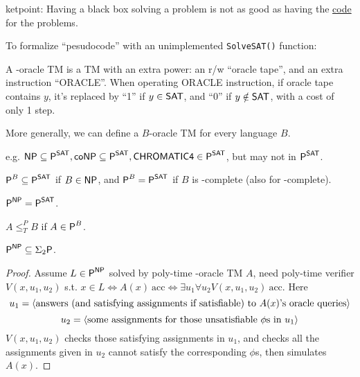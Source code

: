 \documentclass{article}
\begin{document}
ketpoint: Having a black box solving a problem is not as good as having the \ul{code} for the problems.

To formalize ``pesudocode'' with an unimplemented {\tt SolveSAT()} function:

\begin{definition}
  A -oracle TM is a TM with an extra power: an r/w ``oracle tape'', and an extra instruction ``ORACLE''. When operating ORACLE instruction, if oracle tape contains \(y\), it's replaced by ``1'' if \(y \in \prob{SAT}\), and ``0'' if \(y \notin \prob{SAT}\), with a cost of only 1 step.
\end{definition}

\begin{definition}
  More generally, we can define a \(B\)-oracle TM for every language \(B\).
\end{definition}


e.g. \(\NP \subseteq \P^{\prob{SAT}}, \coNP \subseteq \P^{\prob{SAT}}, \prob{CHROMATIC4} \in \P^{\prob{SAT}}\), but  may not in \(\P^{\prob{SAT}}\).

\(\P^{B} \subseteq \P^{\prob{SAT}}\) if \(B \in \NP\), and \(\P^{B} = \P^{\prob{SAT}}\) if \(B\) is \NP-complete (also for \coNP-complete).

\begin{notation}
  \(\P^\NP = \P^{\prob{SAT}}\).
\end{notation}

\begin{definition}
  \(A \leq_T^P B\) if \(A \in \P^B\).
\end{definition}

\begin{theorem}
  \(\P^\NP \subseteq \Sigma_2\P\).
\end{theorem}

\begin{proof}
  Assume \(L \in \P^\NP\) solved by poly-time -oracle TM \(A\), need poly-time verifier \(V(x, u_1, u_2)\) s.t. \(x \in L \iff A(x)\ \text{acc} \iff \exists u_1 \forall u_2 V(x, u_1, u_2)\ \text{acc}\). Here
  \[ u_1 = \encoding{\text{answers (and satisfying assignments if satisfiable) to \(A(x)\)'s oracle queries}} \]
  \[ u_2 = \encoding{\text{some assignments for those unsatisfiable \(\phi\)s in \(u_1\)}} \]
  \(V(x, u_1, u_2)\) checks those satisfying assignments in \(u_1\), and checks all the assignments given in \(u_2\) cannot satisfy the corresponding \(\phi\)s, then simulates \(A(x)\).
\end{proof}
\end{document}
